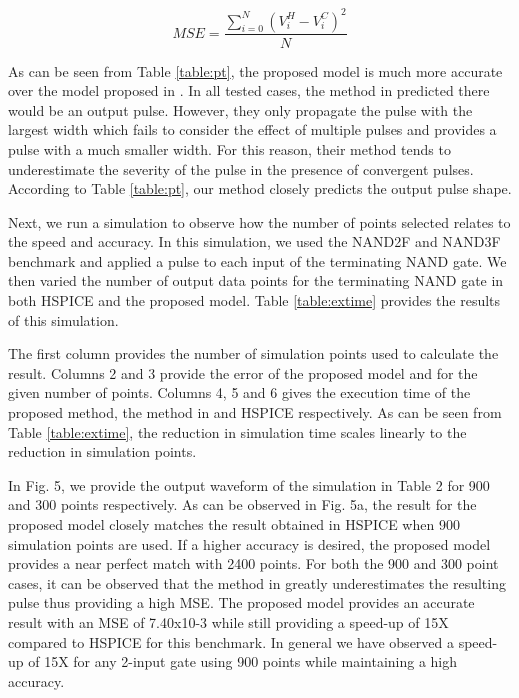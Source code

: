\begin{equation}
MSE = \frac{\sum_{i=0}^{N} (V_i^H - V_i^C)^2}{N}
\end{equation}

As can be seen from Table \ref{table:pt}, the proposed model is much more accurate over the model proposed in \cite{Accurate_Masking}. In all tested cases, the method in \cite{Accurate_Masking} predicted there would be an output pulse. However, they only propagate the pulse with the largest width which fails to consider the effect of multiple pulses and provides a pulse with a much smaller width. For this reason, their method tends to underestimate the severity of the pulse in the presence of convergent pulses. According to Table \ref{table:pt}, our method closely predicts the output pulse shape.

Next, we run a simulation to observe how the number of points selected relates to the speed and accuracy. In this simulation, we used the NAND2F and NAND3F benchmark and applied a pulse to each input of the terminating NAND gate. We then varied the number of output data points for the terminating NAND gate in both HSPICE and the proposed model. Table \ref{table:extime} provides the results of this simulation.

The first column provides the number of simulation points used to calculate the result. Columns 2 and 3 provide the error of the proposed model and \cite{Accurate_Masking} for the given number of points. Columns 4, 5 and 6 gives the execution time of the proposed method, the method in \cite{Accurate_Masking} and HSPICE respectively. As can be seen from Table \ref{table:extime}, the reduction in simulation time scales linearly to the reduction in simulation points. 

In Fig. 5, we provide the output waveform of the simulation in Table 2 for 900 and 300 points respectively. As can be observed in Fig. 5a, the result for the proposed model closely matches the result obtained in HSPICE when 900 simulation points are used. If a higher accuracy is desired, the proposed model provides a near perfect match with 2400 points. For both the 900 and 300 point cases, it can be observed that the method in \cite{Accurate_Masking} greatly underestimates the resulting pulse thus providing a high MSE. The proposed model provides an accurate result with an MSE of 7.40x10-3 while still providing a speed-up of 15X compared to HSPICE for this benchmark. In general we have observed a speed-up of 15X for any 2-input gate using 900 points while maintaining a high accuracy.
  
